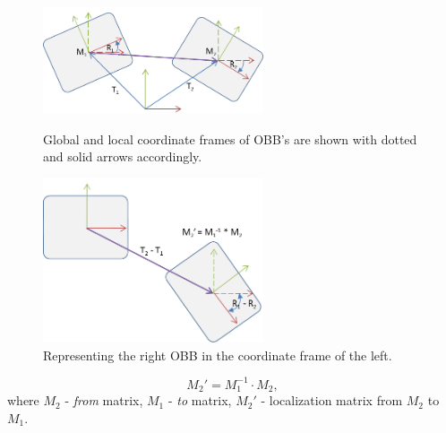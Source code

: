                 \begin{figure}
                \begin{minipage}[t]{6cm}
                \begin{center}
                \includegraphics[width=65mm]{sections/methodology/images/contact/localizationOne.png}
                \caption[Global and local coordinate frames of OBB's.]{\label{localizationFig1} Global and local coordinate frames of OBB's are shown with dotted and solid arrows accordingly.}
                \end{center}
                \end{minipage}
                \hfill
                \begin{minipage}[t]{6cm}
                \begin{center}
                \includegraphics[width=65mm]{sections/methodology/images/contact/localizationTwo.png}
                \caption[Transforming coordinate frames.]{\label{localizationFig} Representing the right OBB in the coordinate frame of the left.}
                \end{center}
                \end{minipage}
                \end{figure}

\begin{equation}\label {localization}
M_{2}' = M_1^{-1}\cdot M_2,
\end{equation} where $M_2$ - \textit{from} matrix, $M_1$ - \emph{to} matrix, $M_2'$ - localization matrix from $M_2$ to $M_1$.


